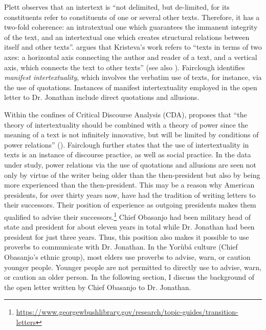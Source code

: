 \documentclass[output=paper,colorlinks,citecolor=brown]{langscibook}
\begin{document}
Plett \citeyearpar[5]{Plett1991} observes that an intertext is “not delimited, but de-limited, for its constituents refer to constituents of one or several other texts. Therefore, it has a two-fold coherence: an intratextual one which guarantees the immanent integrity of the text, and an intertextual one which creates structural relations between itself and other texts”. \citet{Chandler2007} argues that Kristeva’s \citeyearpar[69]{Kristeva1980} work refers to “texts in terms of two axes: a horizontal axis connecting the author and reader of a text, and a vertical axis, which connects the text to other texts'' (see also \citealt{Johnson2015, Raj2015}). Fairclough \citeyearpar[271]{Fairclough1992b} identifies \textit{manifest intertextuality}, which involves the verbatim use of texts, for instance, via the use of quotations. Instances of manifest intertextuality employed in the open letter to Dr. Jonathan include direct  quotations and  allusions.

Within the confines of Critical Discourse Analysis (CDA), \citet{Fairclough1992b} proposes that “the theory of intertextuality should be combined with a theory of power since the meaning of a text is not infinitely innovative, but will be limited by conditions of power relations” (\cite[168]{Johnson2015}). Fairclough further states that the use of intertextuality in texts is an instance of discourse practice, as well as social practice. In the data under study, power relations via the use of quotations and allusions are seen not only by virtue of the writer being older than the then-president but also by being more experienced than the then-president. This may be a reason why American presidents, for over thirty years now, have had the tradition of writing letters to their successors. Their position of experience as outgoing presidents makes them qualified to advise their successors.\footnote{\url{https://www.georgewbushlibrary.gov/research/topic-guides/transition-letters}} Chief Obasanjo had been military head of state and president for about eleven years in total while Dr. Jonathan had been president for just three years. Thus, this position also makes it possible to use proverbs to communicate with Dr. Jonathan. In the Yorùbá culture (Chief Obasanjo's ethnic group), most elders use proverbs to advise, warn, or caution younger people. Younger people are not permitted to directly use  to advise, warn, or caution an older person. In the following section, I discuss the background of the open letter written by Chief Obasanjo to Dr. Jonathan. 
\end{document}
